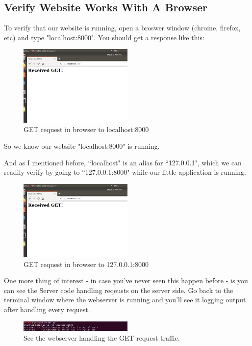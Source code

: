 \documentclass[10pt]{article}
\begin{document}
\subsection{Verify Website Works With A Browser}
To verify that our website is running, open a broswer window (chrome, firefox, etc) and type "localhost:8000". You should get a response like this:

\begin{figure}[h]
  \centering
    \includegraphics[width=0.5\textwidth]{GET.png}
  \caption{GET request in browser to localhost:8000}
\end{figure}

So we know our website "localhost:8000" is running.

And as I mentioned before, ``localhost" is an alias for ``127.0.0.1", which we can readily verify by going to ``127.0.0.1:8000" while our little application is running.

\begin{figure}[h]
  \centering
    \includegraphics[width=0.5\textwidth]{GET.png}
  \caption{GET request in browser to 127.0.0.1:8000 }
\end{figure}

One more thing of interest - in case you've never seen this happen before - is you can see the Server code handling reqeusts on the server side. Go back to the terminal window where the webserver is running and you'll see it logging output after handling every request.

\begin{figure}[h]
  \centering
    \includegraphics[width=0.5\textwidth]{GET_ServerSide.png}
  \caption{See the webserver handling the GET request traffic. }
\end{figure}
\end{document}
